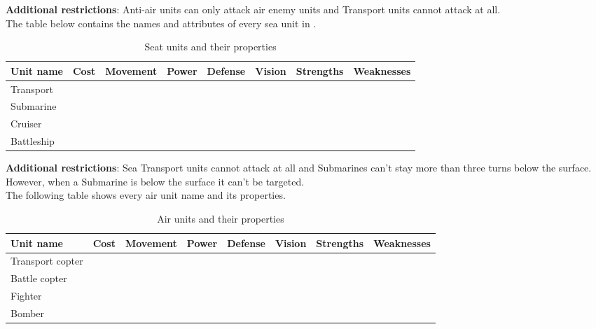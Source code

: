 \textbf{Additional restrictions}: Anti-air units can only attack air enemy
units and Transport units cannot attack at all.\\



The table below contains the names and attributes of every sea unit in \game.\\

\begin{table}[H]
    \label{tab:sea-units}
    \begin{center}
    \begin{tabular}{| l | m{1cm} | m{1.7cm} | m{1.0cm} | m{1.5cm} | m{1.1cm} | m{2.5cm} | m{2.5cm} |}
        \hline
        \textbf{Unit name} & \textbf{Cost} & \textbf{Movement} & \textbf{Power} & \textbf{Defense} & \textbf{Vision} & \textbf{Strengths} & \textbf{Weaknesses} \\
        \hline
        Transport &  &  &  &  &  &  &  \\
        \hline
        Submarine &  &  &  &  &  &  &  \\
        \hline
        Cruiser &  &  &  &  &  &  &  \\
        \hline
        Battleship &  &  &  &  &  &  &  \\
        \hline
    \end{tabular}
    \end{center}
\caption{Seat units and their properties}
\end{table}

\textbf{Additional restrictions}: Sea Transport units cannot attack at all and
Submarines can't stay more than three turns below the surface. However, when a
Submarine is below the surface it can't be targeted.\\


The following table shows every air unit name and its properties.\\

\begin{table}[H]
    \label{tab:air-units}
    \begin{center}
    \begin{tabular}{| l | m{1cm} | m{1.7cm} | m{1.0cm} | m{1.5cm} | m{1.1cm} | m{2.5cm} | m{2.5cm} |}
        \hline
        \textbf{Unit name} & \textbf{Cost} & \textbf{Movement} & \textbf{Power} & \textbf{Defense} & \textbf{Vision} & \textbf{Strengths} & \textbf{Weaknesses} \\
        \hline
        Transport copter &  &  &  &  &  &  &  \\
        \hline
        Battle copter &  &  &  &  &  &  &  \\
        \hline
        Fighter &  &  &  &  &  &  &  \\
        \hline
        Bomber &  &  &  &  &  &  &  \\
        \hline
    \end{tabular}
    \end{center}
\caption{Air units and their properties}
\end{table}

